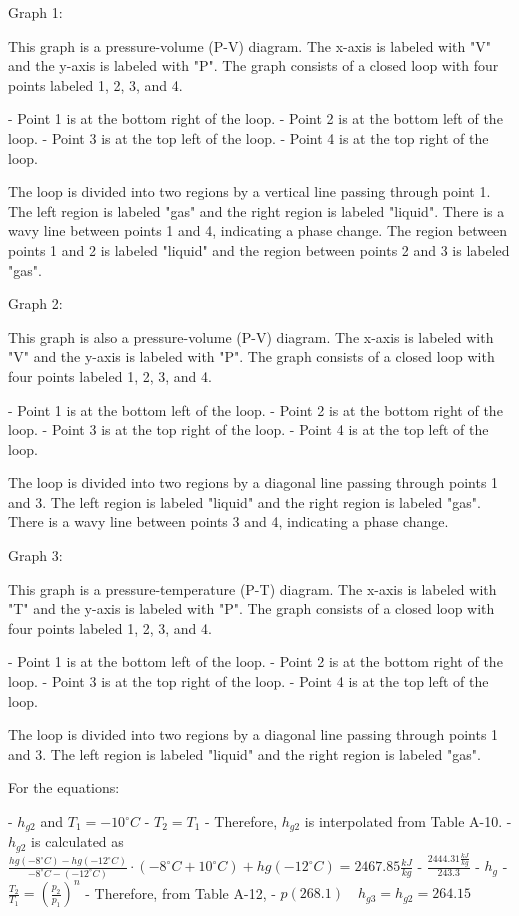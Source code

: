 Graph 1:

This graph is a pressure-volume (P-V) diagram. The x-axis is labeled with "V" and the y-axis is labeled with "P". The graph consists of a closed loop with four points labeled 1, 2, 3, and 4.

- Point 1 is at the bottom right of the loop.
- Point 2 is at the bottom left of the loop.
- Point 3 is at the top left of the loop.
- Point 4 is at the top right of the loop.

The loop is divided into two regions by a vertical line passing through point 1. The left region is labeled "gas" and the right region is labeled "liquid". There is a wavy line between points 1 and 4, indicating a phase change. The region between points 1 and 2 is labeled "liquid" and the region between points 2 and 3 is labeled "gas".

Graph 2:

This graph is also a pressure-volume (P-V) diagram. The x-axis is labeled with "V" and the y-axis is labeled with "P". The graph consists of a closed loop with four points labeled 1, 2, 3, and 4.

- Point 1 is at the bottom left of the loop.
- Point 2 is at the bottom right of the loop.
- Point 3 is at the top right of the loop.
- Point 4 is at the top left of the loop.

The loop is divided into two regions by a diagonal line passing through points 1 and 3. The left region is labeled "liquid" and the right region is labeled "gas". There is a wavy line between points 3 and 4, indicating a phase change.

Graph 3:

This graph is a pressure-temperature (P-T) diagram. The x-axis is labeled with "T" and the y-axis is labeled with "P". The graph consists of a closed loop with four points labeled 1, 2, 3, and 4.

- Point 1 is at the bottom left of the loop.
- Point 2 is at the bottom right of the loop.
- Point 3 is at the top right of the loop.
- Point 4 is at the top left of the loop.

The loop is divided into two regions by a diagonal line passing through points 1 and 3. The left region is labeled "liquid" and the right region is labeled "gas".

For the equations:

- \( h_{g2} \) and \( T_1 = -10^\circ C \)
- \( T_2 = T_1 \)
- Therefore, \( h_{g2} \) is interpolated from Table A-10.
- \( h_{g2} \) is calculated as \( \frac{hg(-8^\circ C) - hg(-12^\circ C)}{-8^\circ C - (-12^\circ C)} \cdot (-8^\circ C + 10^\circ C) + hg(-12^\circ C) = 2467.85 \frac{kJ}{kg} \)
- \( \frac{2444.31 \frac{kJ}{kg}}{243.3} \)
- \( h_{g} \)
- \( \frac{T_2}{T_1} = \left( \frac{p_2}{p_1} \right)^n \)
- Therefore, from Table A-12,
- \( p(268.1) \quad h_{g3} = h_{g2} = 264.15 \)